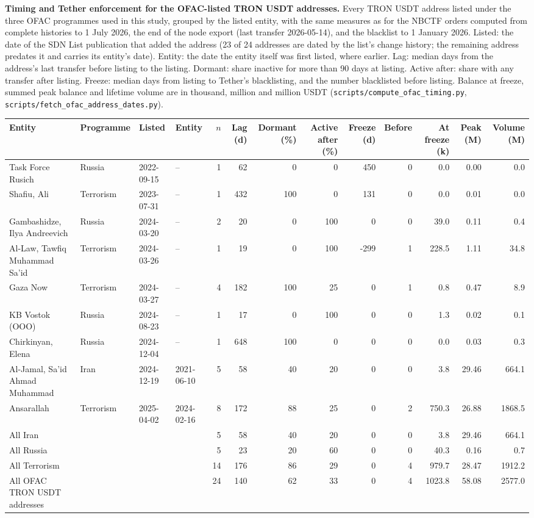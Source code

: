 \caption{\textbf{Timing and Tether enforcement for the OFAC-listed TRON USDT addresses.} Every TRON USDT address listed under the three OFAC programmes used in this study, grouped by the listed entity, with the same measures as for the NBCTF orders computed from complete histories to 1 July 2026, the end of the node export (last transfer 2026-05-14), and the blacklist to 1 January 2026. Listed: the date of the SDN List publication that added the address (23 of 24 addresses are dated by the list's change history; the remaining address predates it and carries its entity's date). Entity: the date the entity itself was first listed, where earlier. Lag: median days from the address's last transfer before listing to the listing. Dormant: share inactive for more than 90 days at listing. Active after: share with any transfer after listing. Freeze: median days from listing to Tether's blacklisting, and the number blacklisted before listing. Balance at freeze, summed peak balance and lifetime volume are in thousand, million and million USDT (\texttt{scripts/compute\_ofac\_timing.py}, \texttt{scripts/fetch\_ofac\_address\_dates.py}).}
\label{tab:ofac-timing}
\begin{tabular}{llllrrrrrrrrr}
\toprule
\textbf{Entity} & \textbf{Programme} & \textbf{Listed} & \textbf{Entity} & $n$ & \textbf{Lag (d)} & \textbf{Dormant (\%)} & \textbf{Active after (\%)} & \textbf{Freeze (d)} & \textbf{Before} & \textbf{At freeze (k)} & \textbf{Peak (M)} & \textbf{Volume (M)} \\
\midrule
Task Force Rusich & Russia & 2022-09-15 & -- & 1 & 62 & 0 & 0 & 450 & 0 & 0.0 & 0.00 & 0.0 \\
Shafiu, Ali & Terrorism & 2023-07-31 & -- & 1 & 432 & 100 & 0 & 131 & 0 & 0.0 & 0.01 & 0.0 \\
Gambashidze, Ilya Andreevich & Russia & 2024-03-20 & -- & 2 & 20 & 0 & 100 & 0 & 0 & 39.0 & 0.11 & 0.4 \\
Al-Law, Tawfiq Muhammad Sa'id & Terrorism & 2024-03-26 & -- & 1 & 19 & 0 & 100 & -299 & 1 & 228.5 & 1.11 & 34.8 \\
Gaza Now & Terrorism & 2024-03-27 & -- & 4 & 182 & 100 & 25 & 0 & 1 & 0.8 & 0.47 & 8.9 \\
KB Vostok (OOO) & Russia & 2024-08-23 & -- & 1 & 17 & 0 & 100 & 0 & 0 & 1.3 & 0.02 & 0.1 \\
Chirkinyan, Elena & Russia & 2024-12-04 & -- & 1 & 648 & 100 & 0 & 0 & 0 & 0.0 & 0.03 & 0.3 \\
Al-Jamal, Sa'id Ahmad Muhammad & Iran & 2024-12-19 & 2021-06-10 & 5 & 58 & 40 & 20 & 0 & 0 & 3.8 & 29.46 & 664.1 \\
Ansarallah & Terrorism & 2025-04-02 & 2024-02-16 & 8 & 172 & 88 & 25 & 0 & 2 & 750.3 & 26.88 & 1868.5 \\
\midrule
All Iran &  &  &  & 5 & 58 & 40 & 20 & 0 & 0 & 3.8 & 29.46 & 664.1 \\
All Russia &  &  &  & 5 & 23 & 20 & 60 & 0 & 0 & 40.3 & 0.16 & 0.7 \\
All Terrorism &  &  &  & 14 & 176 & 86 & 29 & 0 & 4 & 979.7 & 28.47 & 1912.2 \\
All OFAC TRON USDT addresses &  &  &  & 24 & 140 & 62 & 33 & 0 & 4 & 1023.8 & 58.08 & 2577.0 \\
\bottomrule
\end{tabular}
